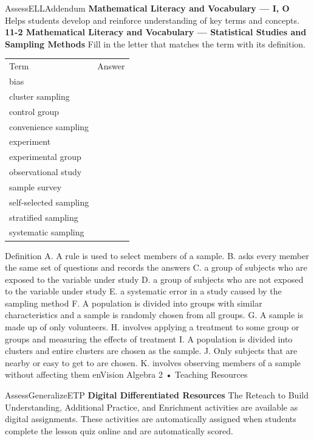 \documentclass{article}
\newenvironment{te-addendum}[2]{}{}     %
\newcommand{\answer}[1]{}               %
\newcommand{\placeholder}[2]{}          %
\begin{document}
\begin{te-addendum}{Assess}{ELLAddendum}
\textbf{Mathematical Literacy and Vocabulary — I, O}
Helps students develop and reinforce understanding of key terms and concepts.
\textbf{11-2 Mathematical Literacy and Vocabulary — Statistical Studies and Sampling Methods}
Fill in the letter that matches the term with its definition.
\begin{tabular}{ll}
Term & Answer \\
bias & \answer{E} \\
cluster sampling & \answer{I} \\
control group & \answer{D} \\
convenience sampling & \answer{J} \\
experiment & \answer{H} \\
experimental group & \answer{C} \\
observational study & \answer{K} \\
sample survey & \answer{B} \\
self-selected sampling & \answer{G} \\
stratified sampling & \answer{F} \\
systematic sampling & \answer{A} \\
\end{tabular}
Definition
A. A rule is used to select members of a sample.
B. asks every member the same set of questions and records the answers
C. a group of subjects who are exposed to the variable under study
D. a group of subjects who are not exposed to the variable under study
E. a systematic error in a study caused by the sampling method
F. A population is divided into groups with similar characteristics and a sample is randomly chosen from all groups.
G. A sample is made up of only volunteers.
H. involves applying a treatment to some group or groups and measuring the effects of treatment
I. A population is divided into clusters and entire clusters are chosen as the sample.
J. Only subjects that are nearby or easy to get to are chosen.
K. involves observing members of a sample without affecting them
enVision Algebra 2 • Teaching Resources
\end{te-addendum}
\begin{te-addendum}{Assess}{GeneralizeETP}
\textbf{Digital Differentiated Resources}
The Reteach to Build Understanding, Additional Practice, and Enrichment activities are available as digital assignments. These activities are automatically assigned when students complete the lesson quiz online and are automatically scored.
\placeholder{illustration}{Tablet screenshot of digital practice. Prompt: Solve the system of equations by graphing, y=3x+4 and y=-2x+4. Use the graphing tool to graph the system. Click to enlarge graph. Empty square coordinate grid with x and y axes from -10 to 10 and tick marks every unit, labels every two units, arrowheads on both ends of both axes. Help Me Solve This, View an Example, Video, Textbook, Glossary, Math Tools, Print; Clear All; Check Answer; Review progress; Back; Next.}
\end{te-addendum}
\end{document}
